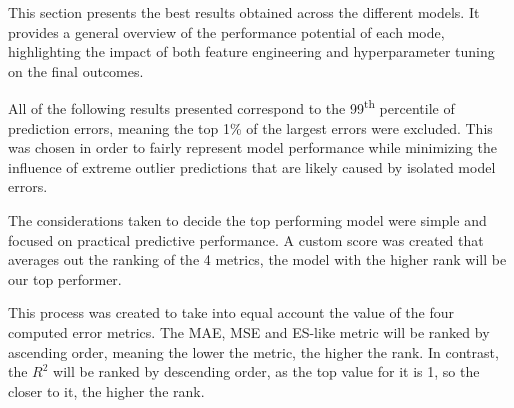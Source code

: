 \documentclass[12pt]{report} %
\begin{document}
This section presents the best results obtained across the different models. It provides a general overview of the performance potential of each mode, highlighting the impact of both feature engineering and hyperparameter tuning on the final outcomes.

All of the following results presented correspond to the 99\textsuperscript{th} percentile of prediction errors, meaning the top 1\% of the largest errors were excluded. This was chosen in order to fairly represent model performance while minimizing the influence of extreme outlier predictions that are likely caused by isolated model errors.

The considerations taken to decide the top performing model were simple and focused on practical predictive performance. A custom score was created that averages out the ranking of the 4 metrics, the model with the higher rank will be our top performer.

This process was created to take into equal account the value of the four computed error metrics. The MAE, MSE and ES-like metric will be ranked by ascending order, meaning the lower the metric, the higher the rank. In contrast, the $R^2$ will be ranked by descending order, as the top value for it is 1, so the closer to it, the higher the rank.







\end{document}
